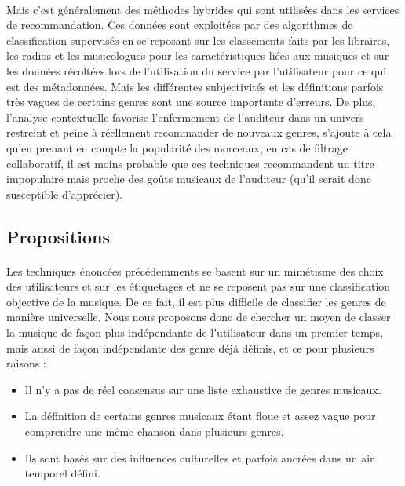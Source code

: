 \documentclass[soumission]{ir}
\begin{document}
\paragraph{}
Mais c’est généralement des méthodes hybrides qui sont utilisées dans les services de recommandation. Ces 
données sont exploitées par des algorithmes de classification supervisés en se reposant sur les classements 
faits par les libraires, les radios et les musicologues pour les caractéristiques liées aux musiques et sur 
les données récoltées lors de l’utilisation du service par l’utilisateur pour ce qui est des métadonnées. 
Mais les différentes subjectivités et les définitions parfois très vagues de certains genres sont une source 
importante d’erreurs. De plus, l’analyse contextuelle favorise l’enfermement de l’auditeur dans un univers 
restreint et peine à réellement recommander de nouveaux genres, s’ajoute à cela qu’en prenant en compte la 
popularité des morceaux, en cas de filtrage collaboratif, il est moins probable que ces techniques 
recommandent un titre impopulaire mais proche des goûts musicaux de l’auditeur (qu’il serait donc 
susceptible d'apprécier).

\subsection{Propositions}
\paragraph{}
Les techniques énoncées précédemments se basent sur un mimétisme des choix des utilisateurs et sur les 
étiquetages et ne se reposent pas sur une classification objective de la musique. De ce fait, il est plus 
difficile de classifier les genres de manière universelle. Nous nous proposons donc de chercher un moyen de 
classer la musique de façon plus indépendante de l’utilisateur dans un premier temps, mais aussi de façon 
indépendante des genre déjà définis, et ce pour plusieurs raisons :
\begin{itemize}
    \item {Il n’y a pas de réel consensus sur une liste exhaustive de genres musicaux.}
    \item {La définition de certains genres musicaux étant floue et assez vague pour comprendre une même 
    chanson dans plusieurs genres.}
    \item {Ils sont basés sur des influences culturelles et parfois ancrées dans un air temporel défini.}
\end{itemize}
\end{document}
